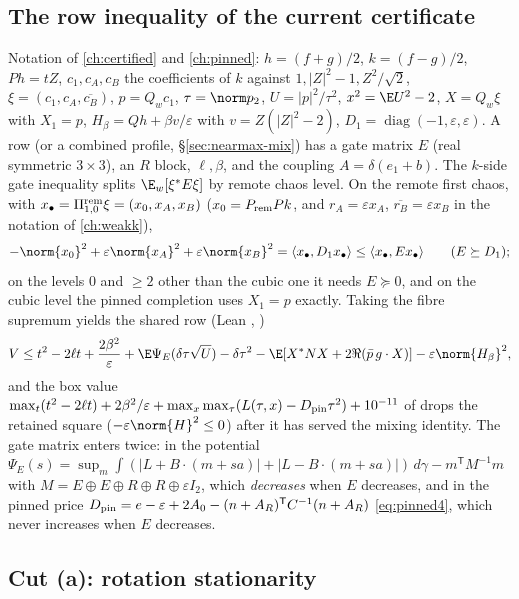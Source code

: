 \subsection{The row inequality of the current certificate}\label{sec:nearmax-row}
Notation of \autoref{ch:certified} and \autoref{ch:pinned}: $h=(f+g)/2$, $k=(f-g)/2$, $Ph=tZ$, $c_1,c_A,c_B$ the coefficients of $k$ against $1,|Z|^2-1,Z^2/\sqrt2$,
$\xi=(c_1,c_A,\overline{c_B})$, $p=Q_wc_1$, $\tau=\norm p_2$, $U=|p|^2/\tau^2$, $x^2=\E U^2-2$, $X=Q_w\xi$ with $X_1=p$, $H_\beta=Qh+\beta v/\varepsilon$ with
$v=Z(|Z|^2-2)$, $D_1=\operatorname{diag}(-1,\varepsilon,\varepsilon)$. A row (or a combined profile, \S\ref{sec:nearmax-mix}) has a gate matrix $E$ (real symmetric $3\times3$), an $R$
block, $\ell,\beta$, and the coupling $A=\delta(e_1+b)$. The $k$-side gate inequality splits $\E_w[\xi^*E\xi]$ by remote chaos level. On the remote first chaos, with
$x_\bullet=\Pi^{\rm rem}_{1,0}\xi=(x_0,x_A,x_B)$ ($x_0=P_{\rm rem}Pk$, and $r_A=\varepsilon x_A$, $\overline{r_B}=\varepsilon x_B$ in the notation of \autoref{ch:weakk}),
\begin{equation}\label{eq:nm-level1}
-\norm{x_0}^2+\varepsilon\norm{x_A}^2+\varepsilon\norm{x_B}^2=\langle x_\bullet,D_1x_\bullet\rangle\le\langle x_\bullet,Ex_\bullet\rangle\qquad(E\succeq D_1);
\end{equation}
on the levels $0$ and $\ge2$ other than the cubic one it needs $E\succeq0$, and on the cubic level the pinned completion uses $X_1=p$ exactly. Taking the fibre supremum yields
the shared row (Lean , )
\begin{equation}\label{eq:nm-row}
V\le t^2-2\ell t+\frac{2\beta^2}\varepsilon+\E\Psi_E(\delta\tau\sqrt U)-\delta\tau^2-\E[X^*NX+2\Re(\bar p\,g\cdot X)]-\varepsilon\norm{H_\beta}^2 ,
\end{equation}
and the box value $\max_t(t^2-2\ell t)+2\beta^2/\varepsilon+\max_x\max_\tau(L(\tau,x)-D_{\rm pin}\tau^2)+10^{-11}$ of  drops the retained square ($-\varepsilon\norm{H}^2\le0$)
after it has served the mixing identity. The gate matrix enters twice: in the potential $\Psi_E(s)=\sup_m\int(|L+B\cdot(m+sa)|+|L-B\cdot(m+sa)|)\,d\gamma-m^{\mathsf T}M^{-1}m$ with
$M=E\oplus E\oplus R\oplus R\oplus\varepsilon I_2$, which \emph{decreases} when $E$ decreases, and in the pinned price $D_{\rm pin}=e-\varepsilon+2A_0-(n+A_R)^{\mathsf T}C^{-1}(n+A_R)$
\eqref{eq:pinned4}, which never increases when $E$ decreases.

\subsection{Cut (a): rotation stationarity}\label{sec:nearmax-rot}
